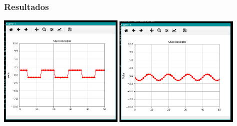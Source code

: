 \documentclass{beamer}
\begin{document}
\begin{frame}
\frametitle{Resultados}
\centering
\includegraphics[width=0.45\textwidth]{Osc1.png}
\includegraphics[width=0.45\textwidth]{Osc2.png}
\end{frame}
\end{document}
